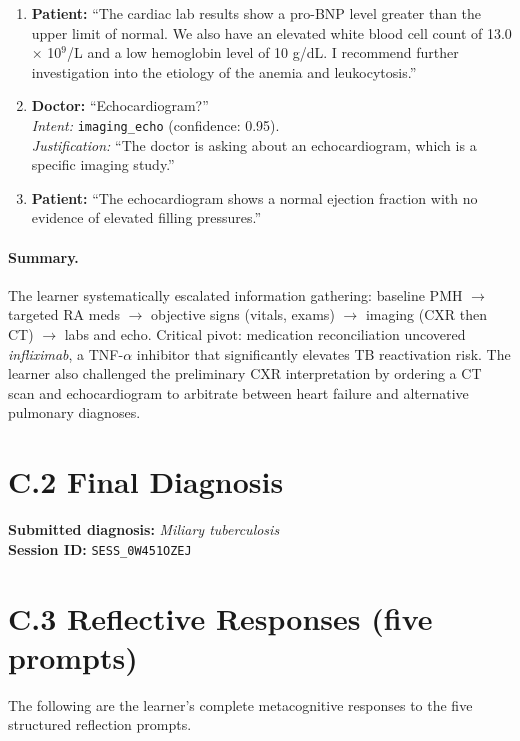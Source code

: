 \begin{enumerate}
  \item \textbf{Patient:} ``The cardiac lab results show a pro-BNP level greater than the upper limit of normal. We also have an elevated white blood cell count of 13.0 × 10$^{9}$/L and a low hemoglobin level of 10 g/dL. I recommend further investigation into the etiology of the anemia and leukocytosis.''

  \item \textbf{Doctor:} ``Echocardiogram?'' \\
  \emph{Intent:} \texttt{imaging\_echo} (confidence: 0.95). \\
  \emph{Justification:} ``The doctor is asking about an echocardiogram, which is a specific imaging study.''

  \item \textbf{Patient:} ``The echocardiogram shows a normal ejection fraction with no evidence of elevated filling pressures.''
\end{enumerate}

\paragraph{Summary.} The learner systematically escalated information gathering: baseline PMH $\rightarrow$ targeted RA meds $\rightarrow$ objective signs (vitals, exams) $\rightarrow$ imaging (CXR then CT) $\rightarrow$ labs and echo. Critical pivot: medication reconciliation uncovered \emph{infliximab}, a TNF-$\alpha$ inhibitor that significantly elevates TB reactivation risk. The learner also challenged the preliminary CXR interpretation by ordering a CT scan and echocardiogram to arbitrate between heart failure and alternative pulmonary diagnoses.

\section*{C.2 \quad Final Diagnosis}
\label{app:session_s6:diagnosis}
\noindent
\textbf{Submitted diagnosis:} \emph{Miliary tuberculosis} \\
\textbf{Session ID:} \texttt{SESS\_0W451OZEJ}

\section*{C.3 \quad Reflective Responses (five prompts)}
\label{app:session_s6:reflection}

\noindent
The following are the learner's complete metacognitive responses to the five structured reflection prompts.

